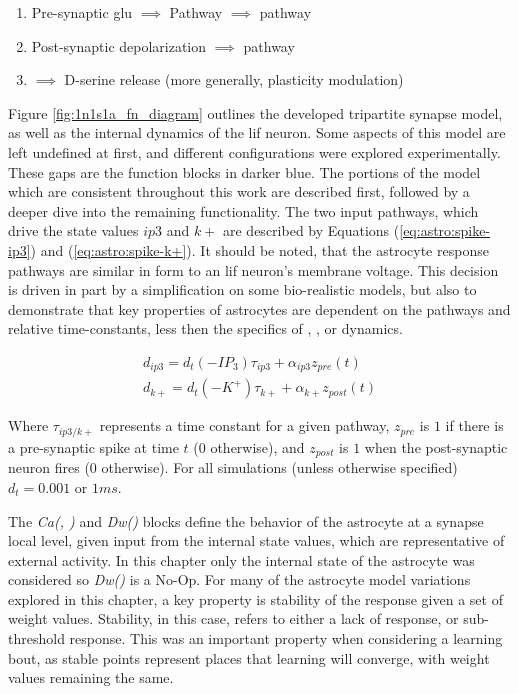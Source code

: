 \begin{enumerate}
  \item Pre-synaptic \gls{glu} $\implies$ \ipt Pathway $\implies$ \ca pathway
  \item Post-synaptic depolarization \kp $\implies$ \ca pathway
  \item \ca $\implies$ D-serine release (more generally, plasticity modulation)
\end{enumerate}


Figure \ref{fig:1n1s1a_fn_diagram} outlines the developed tripartite synapse
model, as well as the internal dynamics of the \gls{lif} neuron. Some aspects of this
model are left undefined at first, and different configurations were explored
experimentally. These gaps are the function blocks in darker blue. The
portions of the model which are consistent throughout this work are described
first, followed by a deeper dive into the remaining functionality. The two input
pathways, which drive the state values $ip3$ and $k+$ are described by Equations
(\ref{eq:astro:spike-ip3}) and (\ref{eq:astro:spike-k+}). It should be noted, that
the astrocyte response pathways are similar in form to an \gls{lif} neuron's membrane
voltage. This decision is driven in part by a simplification on some
bio-realistic models, but also to demonstrate that key properties of astrocytes
are dependent on the pathways and relative time-constants, less then the specifics of
\ca, \ipt, or \kp dynamics.

\begin{align}
  d_{ip3} = d_t (-IP_3)\tau_{ip3} + \alpha_{ip3} z_{pre}(t) \label{eq:astro:spike-ip3} \\
  d_{k+} = d_t (-K^+)\tau_{k+} + \alpha_{k+} z_{post}(t) \label{eq:astro:spike-k+}
\end{align}

Where $\tau_{ip3/k+}$ represents a time constant for a given pathway, $z_{pre}$
is $1$ if there is a pre-synaptic spike at time $t$ ($0$ otherwise), and
$z_{post}$ is $1$ when the post-synaptic neuron fires ($0$ otherwise). For all
simulations (unless otherwise specified) $d_t = 0.001$ or $1ms$.

The \emph{Ca(\ipt, \kp)} and \emph{Dw(\ca)} blocks define the behavior
of the astrocyte at a synapse local level, given input from the internal state values,
which are representative of external activity. In this chapter only the internal
state of the astrocyte was considered so \emph{Dw(\ca)} is a
No-Op. For many of the astrocyte model variations explored in this chapter, a
key property is stability of the response given a set of weight
values. Stability, in this case, refers to either a lack of \ca response, or
sub-threshold \ca response. This was an important property when considering
a learning bout, as stable points represent places that learning will converge,
with weight values remaining the same.

